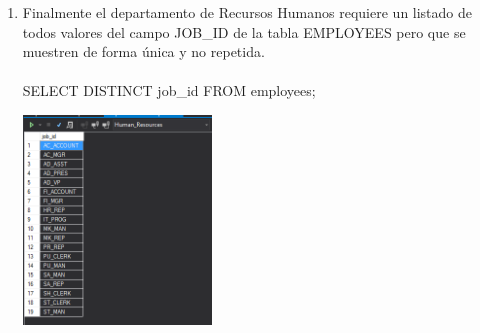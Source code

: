 \begin{enumerate}[1.]
	\item Finalmente el departamento de Recursos Humanos requiere un listado de todos valores del campo JOB\_ID de la tabla EMPLOYEES pero que se muestren de forma única y no repetida.
	\\
	\\SELECT DISTINCT job\_id FROM employees;

	\begin{center}
	\includegraphics[width=5cm]{./Imagenes/Actividad02_3}
	\end{center}

\end{enumerate}
